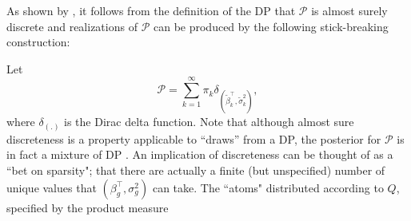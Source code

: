 As shown by \citet{sethuraman}, it follows from the definition of the DP that $\mathcal{P}$ is almost surely discrete and realizations of $\mathcal{P}$ can be produced by the following stick-breaking construction:

Let 
\begin{equation}
\label{eq:P}
\mathcal{P} =\sum_{k=1}^\infty \pi_k \delta_{\left(\tilde{\beta}_k^\top ,\tilde{\sigma}^2_k\right)},
\end{equation}
where $\delta_{(.)}$ is the Dirac delta function. Note that although almost sure discreteness is a property applicable to ``draws'' from a DP, the posterior for $\mathcal{P}$ is in fact a mixture of DP \citep{antoniak}. An implication of discreteness can be thought of as a ``bet on sparsity"; that there are actually a finite (but unspecified) number of unique values that $(\beta_g^\top,\sigma^2_g)$ can take.  
 The ``atoms" distributed according to $Q$, specified by the product measure

